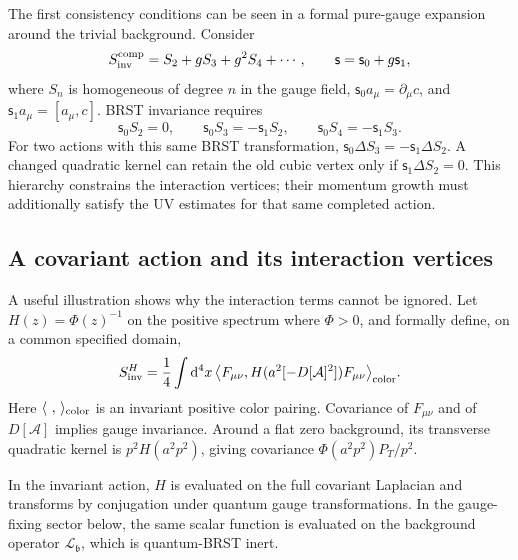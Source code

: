 \documentclass[final,5p,times,twocolumn,numbers,nopreprintline]{elsarticle}
\numberwithin{equation}{section}
\theoremstyle{definition}
\theoremstyle{remark}
\newcommand{\dd}{\mathop{}\!\mathrm d}
\newcommand{\bb}{\mathfrak b}
\newcommand{\BR}{\mathsf s}
\newcommand{\Ph}{\Phi}
\begin{document}
The first consistency conditions can be seen in a formal pure-gauge
expansion around the trivial background. Consider
\[
 S_{\rm inv}^{\rm comp}=S_2+gS_3+g^2S_4+\cdots,\qquad
 \BR=\BR_0+g\BR_1,
\]
where \(S_n\) is homogeneous of degree \(n\) in the gauge field,
\(\BR_0a_\mu=\partial_\mu c\), and
\(\BR_1a_\mu=[a_\mu,c]\). BRST invariance requires
\begin{equation}
 \BR_0S_2=0,\qquad
 \BR_0S_3=-\BR_1S_2,\qquad
 \BR_0S_4=-\BR_1S_3.
 \label{eq:quadratic-vertex-hierarchy}
\end{equation}
For two actions with this same BRST transformation,
\(\BR_0\Delta S_3=-\BR_1\Delta S_2\).
A changed quadratic kernel can retain the old cubic vertex only if
\(\BR_1\Delta S_2=0\). This hierarchy constrains the interaction
vertices; their momentum growth must additionally satisfy the UV
estimates for that same completed action.

\subsection{A covariant action and its interaction vertices}

A useful illustration shows why the interaction terms cannot be
ignored. Let \(H(z)=\Ph(z)^{-1}\) on the positive spectrum where
\(\Ph>0\), and formally define, on a common specified domain,
\begin{equation}
 S_{\rm inv}^{H}
 =\frac14\int\dd^4x\,
 \bigl\langle F_{\mu\nu},
 H(a^2[-D[\mathcal A]^2])F_{\mu\nu}\bigr\rangle_{\rm color}.
 \label{eq:covariant-H-action}
\end{equation}
Here \(\langle\ ,\,\rangle_{\rm color}\) is an invariant positive
color pairing. Covariance of \(F_{\mu\nu}\) and of \(D[\mathcal A]\)
implies gauge invariance. Around a flat zero background, its
transverse quadratic kernel is \(p^2H(a^2p^2)\), giving covariance
\(\Ph(a^2p^2)P_T/p^2\).

In the invariant action, \(H\) is evaluated on the full covariant
Laplacian and transforms by conjugation under quantum gauge
transformations. In the gauge-fixing sector below, the same scalar
function is evaluated on the background operator
\(\mathscr L_{\bb}\), which is quantum-BRST inert.
\end{document}
